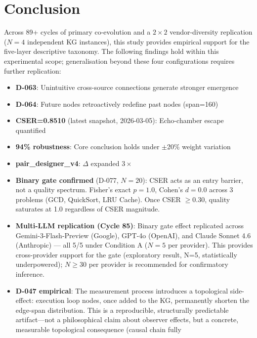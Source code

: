 \documentclass[12pt]{article}
\begin{document}
\section{Conclusion}

Across 89+ cycles of primary co-evolution and a $2\times2$ vendor-diversity
replication ($N=4$ independent KG instances), this study provides empirical support
for the five-layer descriptive taxonomy. The following findings hold within this
experimental scope; generalisation beyond these four configurations requires
further replication:

\begin{itemize}
  \item \textbf{D-063}: Unintuitive cross-source connections generate stronger emergence
  \item \textbf{D-064}: Future nodes retroactively redefine past nodes (span=160)
  \item \textbf{CSER=0.8510} (latest snapshot, 2026-03-05): Echo-chamber escape quantified
  \item \textbf{94\% robustness}: Core conclusion holds under $\pm$20\% weight variation
  \item \textbf{pair\_designer\_v4}: $\Delta$ expanded $3\times$
  \item \textbf{Binary gate confirmed} (D-077, $N=20$): CSER acts as an entry barrier,
        not a quality spectrum. Fisher's exact $p=1.0$, Cohen's $d=0.0$ across
        3 problems (GCD, QuickSort, LRU Cache). Once CSER $\geq 0.30$, quality
        saturates at 1.0 regardless of CSER magnitude.
  \item \textbf{Multi-LLM replication (Cycle 85)}: Binary gate effect replicated
        across Gemini-3-Flash-Preview (Google), GPT-4o (OpenAI), and
        Claude Sonnet 4.6 (Anthropic) --- all 5/5 under Condition A ($N=5$ per provider).
        This provides cross-provider support for the gate (exploratory result, N=5, statistically underpowered);
        $N \geq 30$ per provider is recommended for confirmatory inference.
  \item \textbf{D-047 empirical}: The measurement process introduces a topological side-effect:
        execution loop nodes, once added to the KG, permanently shorten the edge-span distribution.
        This is a reproducible, structurally predictable artifact---not a philosophical claim about
        observer effects, but a concrete, measurable topological consequence (causal chain fully

\end{itemize}
\end{document}
